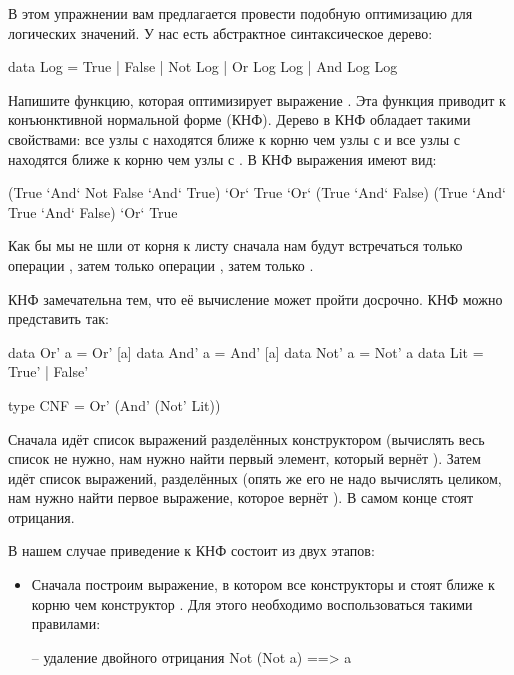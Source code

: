 \begin{itemize}
  В этом упражнении вам предлагается провести подобную оптимизацию для
  логических значений. У нас есть абстрактное синтаксическое дерево:


  \begin{code}
  data Log    = True
              | False
              | Not Log
              | Or  Log Log
              | And Log Log            
  \end{code}

  Напишите функцию, которая оптимизирует выражение . Эта функция
  приводит  к конъюнктивной нормальной форме (КНФ). Дерево в КНФ
  обладает такими свойствами: все узлы с  находятся ближе к корню
  чем узлы с  и все узлы с  находятся ближе к корню чем
  узлы с . В КНФ выражения имеют вид:


  \begin{code}
  (True `And` Not False `And` True) `Or` True `Or` (True `And` False)
  (True `And` True `And` False) `Or` True
  \end{code}

  Как бы мы не шли от корня к листу сначала нам будут встречаться только
  операции , затем только операции , затем только
  .

  КНФ замечательна тем, что её вычисление может пройти досрочно. КНФ
  можно представить так:


  \begin{code}
  data Or'  a = Or'  [a]
  data And' a = And' [a]
  data Not' a = Not'  a
  data Lit    = True' | False'

  type CNF = Or' (And' (Not' Lit))
  \end{code}

  Сначала идёт список выражений разделённых конструктором 
  (вычислять весь список не нужно, нам нужно найти первый элемент,
  который вернёт ). Затем идёт список выражений, разделённых
   (опять же его не надо вычислять целиком, нам нужно найти
  первое выражение, которое вернёт ). В самом конце стоят
  отрицания.

  В нашем случае приведение к КНФ состоит из двух этапов:

  \begin{itemize}
  \item
    Сначала построим выражение, в котором все конструкторы  и
     стоят ближе к корню чем конструктор . Для этого
    необходимо воспользоваться такими правилами:


    \begin{code}
    -- удаление двойного отрицания
    Not (Not a)  ==> a  


\end{code}
\end{itemize}
\end{itemize}
